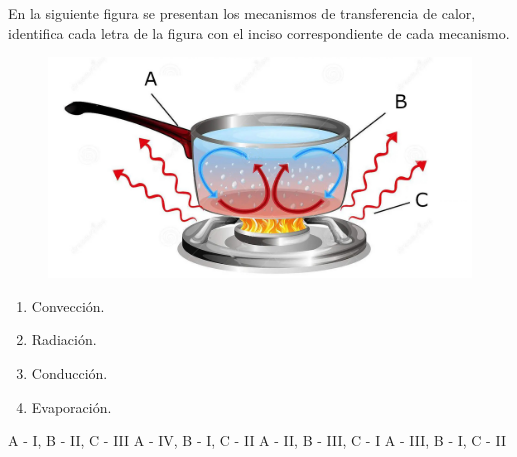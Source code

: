 \documentclass[12pt, letter]{exam}
\begin{document}
\begin{questions}

    \question En la siguiente figura se presentan los mecanismos de transferencia de calor, identifica cada letra de la figura con el inciso correspondiente de cada mecanismo.
    \begin{figure}[H]
        \centering
        \includegraphics[scale=0.2]{Transferencia_Calor_01.jpg}
    \end{figure}
    \begin{multicols}{4}
    \begin{enumerate}[label=\Roman*)]
        \item Convección.
        \item Radiación.
        \item Conducción.
        \item Evaporación.
    \end{enumerate}
    \end{multicols}
    \begin{tasks}
        \task A - I, B - II, C - III
        \task A - IV, B - I, C - II
        \task A - II, B - III, C - I
        \task A - III, B - I, C - II
    \end{tasks}


\end{questions}
\end{document}
